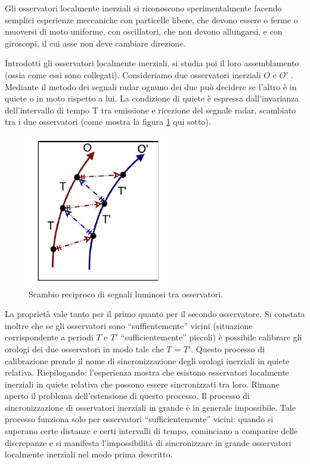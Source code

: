 Gli osservatori localmente inerziali si riconoscono sperimentalmente facendo semplici 
esperienze meccaniche con particelle libere, che devono essere o ferme o muoversi di moto uniforme, con oscillatori, 
che non devono allungarsi, e con giroscopi, il cui asse non deve cambiare direzione.

Introdotti gli osservatori localmente inerziali, si studia poi il loro assemblamento 
(ossia come essi sono collegati). Consideriamo due osservatori inerziali
$O$ e $O'$ . Mediante il metodo dei segnali radar ognuno dei due può decidere se
l'altro è in quiete o in moto rispetto a lui. La condizione di quiete è espressa
dall'invarianza dell'intervallo di tempo T tra emissione e ricezione del segnale
radar, scambiato tra i due osservatori (come mostra la figura \ref{osservatori_radar} qui sotto).

\begin{figure}[htbp]\label{osservatori_radar}
   \centering
   \includegraphics[scale=1]{immagini/minkowski/osservatori_radar}
   \caption{Scambio reciproco di segnali luminosi tra osservatori.}
\end{figure}

La proprietà vale tanto per il primo quanto per il secondo osservatore. Si
constata inoltre che se gli osservatori sono “suffientemente” vicini (situazione 
corrispondente a periodi $T$ e $T'$ ``sufficientemente'' piccoli) è possibile
calibrare gli orologi dei due osservatori in modo tale che $T$ = $T'$. Questo
processo di calibrazione prende il nome di sincronizzazione degli orologi
inerziali in quiete relativa.
Riepilogando: l'esperienza mostra che esistono osservatori localmente
inerziali in quiete relativa che possono essere sincronizzati tra loro. Rimane
aperto il problema dell'estensione di questo processo. Il processo di sincronizzazione 
di osservatori inerziali in grande è in generale impossibile. Tale
processo funziona solo per osservatori ``sufficientemente'' vicini: quando si
superano certe distanze e certi intervalli di tempo, cominciano a comparire 
delle discrepanze e si manifesta l'impossibilità di sincronizzare in grande
osservatori localmente inerziali nel modo prima descritto.

